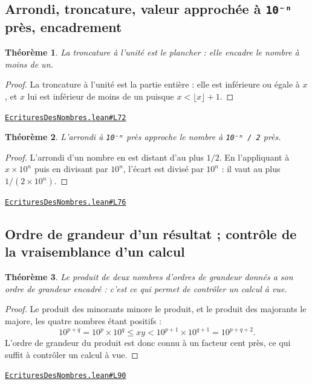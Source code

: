 \documentclass[11pt,a4paper]{article}
\theoremstyle{definition}
\theoremstyle{plain}
\newtheorem{theoreme}{Théorème}
\newcommand{\source}[2]{\par\smallskip\noindent\hfill{\footnotesize\href{#1}{\texttt{#2}}}\par\smallskip}
\begin{document}
\subsection{Arrondi, troncature, valeur approchée à \texttt{10⁻ⁿ} près, encadrement}

\begin{theoreme}
La troncature à l'unité est le plancher : elle encadre le nombre à moins de un.
\end{theoreme}

\begin{proof}
La troncature à l'unité est la partie entière : elle est inférieure ou égale à $x$,
et $x$ lui est inférieur de moins de un puisque $x < \lfloor x \rfloor + 1$.
\end{proof}
\source{https://github.com/Commutator-IO/learn-lean/blob/main/cours/01-college/01-nombres-et-calculs/EcrituresDesNombres.lean\#L72}{EcrituresDesNombres.lean\#L72}

\begin{theoreme}
L'arrondi à \texttt{10⁻ⁿ} près approche le nombre à \texttt{10⁻ⁿ / 2} près.
\end{theoreme}

\begin{proof}
L'arrondi d'un nombre en est distant d'au plus $1/2$. En l'appliquant à
$x \times 10^n$ puis en divisant par $10^n$, l'écart est divisé par $10^n$ : il vaut au plus
$1/(2 \times 10^n)$.
\end{proof}
\source{https://github.com/Commutator-IO/learn-lean/blob/main/cours/01-college/01-nombres-et-calculs/EcrituresDesNombres.lean\#L76}{EcrituresDesNombres.lean\#L76}

\subsection{Ordre de grandeur d'un résultat ; contrôle de la vraisemblance d'un calcul}

\begin{theoreme}
Le produit de deux nombres d'ordres de grandeur donnés a son ordre de grandeur
encadré : c'est ce qui permet de contrôler un calcul à vue.
\end{theoreme}

\begin{proof}
Le produit des minorants minore le produit, et le produit des majorants le majore,
les quatre nombres étant positifs :
\[
10^{p+q} = 10^p \times 10^q \le xy < 10^{p+1} \times 10^{q+1} = 10^{p+q+2} .
\]
L'ordre de grandeur du produit est donc connu à un facteur cent près, ce qui suffit à
contrôler un calcul à vue.
\end{proof}
\source{https://github.com/Commutator-IO/learn-lean/blob/main/cours/01-college/01-nombres-et-calculs/EcrituresDesNombres.lean\#L90}{EcrituresDesNombres.lean\#L90}
\end{document}
